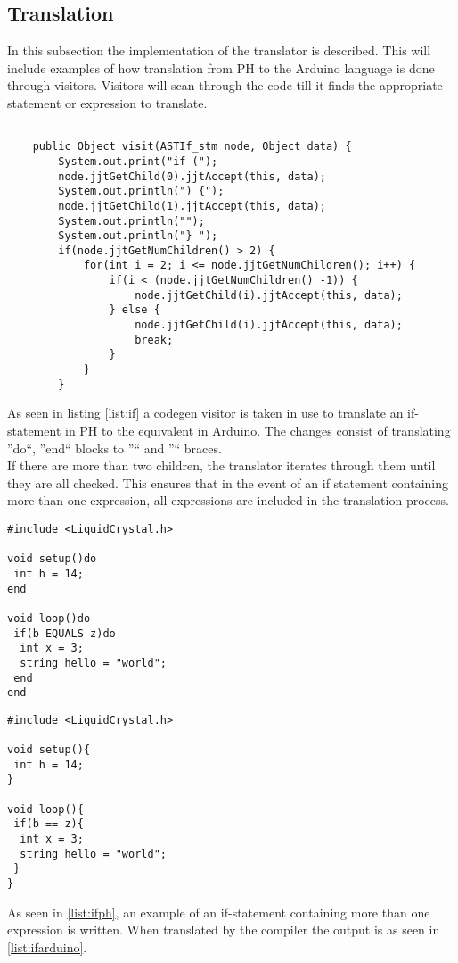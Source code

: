 \subsection{Translation}
In this subsection the implementation of the translator is described. This will include examples of how translation from PH to the Arduino language is done through visitors.
Visitors will scan through the code till it finds the appropriate statement or expression to translate.

\begin{lstlisting}[Caption=Visitor for translation of an if-statement, label=list:if]

	public Object visit(ASTIf_stm node, Object data) {
		System.out.print("if (");
		node.jjtGetChild(0).jjtAccept(this, data);
		System.out.println(") {");
		node.jjtGetChild(1).jjtAccept(this, data);
		System.out.println("");
		System.out.println("} ");
		if(node.jjtGetNumChildren() > 2) {
			for(int i = 2; i <= node.jjtGetNumChildren(); i++) {
				if(i < (node.jjtGetNumChildren() -1)) {
					node.jjtGetChild(i).jjtAccept(this, data);
				} else {
					node.jjtGetChild(i).jjtAccept(this, data);
					break;
				}
			}
		}

\end{lstlisting}

As seen in listing \ref{list:if} a codegen visitor is taken in use to translate an if-statement in PH to the equivalent in Arduino. The changes consist of translating ''do``, ''end`` blocks to ''{`` and ''}`` braces. 
\\If there are more than two children, the translator iterates through them until they are all checked. This ensures that in the event of an if statement containing more than one expression, all expressions are included in the translation process.  

\begin{lstlisting}[Caption=Example of an if-statement written in PH, label=list:ifph]
#include <LiquidCrystal.h>

void setup()do
 int h = 14;
end

void loop()do
 if(b EQUALS z)do
  int x = 3;
  string hello = "world";
 end
end
\end{lstlisting}

\begin{lstlisting}[Caption=Example of an if-statement in the Arduino language, translated by the compiler from PH, label=list:ifarduino]
#include <LiquidCrystal.h>

void setup(){
 int h = 14;
}

void loop(){
 if(b == z){
  int x = 3;
  string hello = "world";
 }
}
\end{lstlisting}

As seen in \ref{list:ifph}, an example of an if-statement containing more than one expression is written. When translated by the compiler the output is as seen in \ref{list:ifarduino}.




